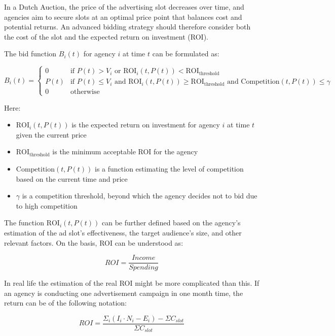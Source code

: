 In a Dutch Auction, the price of the advertising slot decreases over time, and agencies aim to secure slots at an optimal price point that balances cost and potential returns. An advanced bidding strategy should therefore consider both the cost of the slot and the expected return on investment (ROI).

The bid function \( B_i(t) \) for agency \( i \) at time \( t \) can be formulated as:

\[
B_i(t) = 
\begin{cases} 
0 & \text{if } P(t) > V_i \text{ or } \text{ROI}_i(t, P(t)) < \text{ROI}_{\text{threshold}} \\
P(t) & \text{if } P(t) \leq V_i \text{ and } \text{ROI}_i(t, P(t)) \geq \text{ROI}_{\text{threshold}} \text{ and } \text{Competition}(t, P(t)) \leq \gamma \\
0 & \text{otherwise}
\end{cases}
\]

Here:
\begin{itemize}
    \item \( \text{ROI}_i(t, P(t)) \) is the expected return on investment for agency \( i \) at time \( t \) given the current price
    \item \( \text{ROI}_{\text{threshold}} \) is the minimum acceptable ROI for the agency
    \item \( \text{Competition}(t, P(t)) \) is a function estimating the level of competition based on the current time and price
    \item \( \gamma \) is a competition threshold, beyond which the agency decides not to bid due to high competition
\end{itemize}

The function \( \text{ROI}_i(t, P(t)) \) can be further defined based on the agency’s estimation of the ad slot’s effectiveness, the target audience's size, and other relevant factors.  On the basis, ROI can be understood as:

\begin{equation*}
    ROI = \frac{Income}{Spending}
\end{equation*}

In real life the estimation of the real ROI might be more complicated than this. If an agency is conducting one advertisement campaign in one month time, the return can be of the following notation:

\begin{equation*}
        ROI = \frac{\Sigma_i(I_i \cdot N_i - E_i) - \Sigma{C_{slot}}}{\Sigma{C_{slot}}}
\end{equation*}

